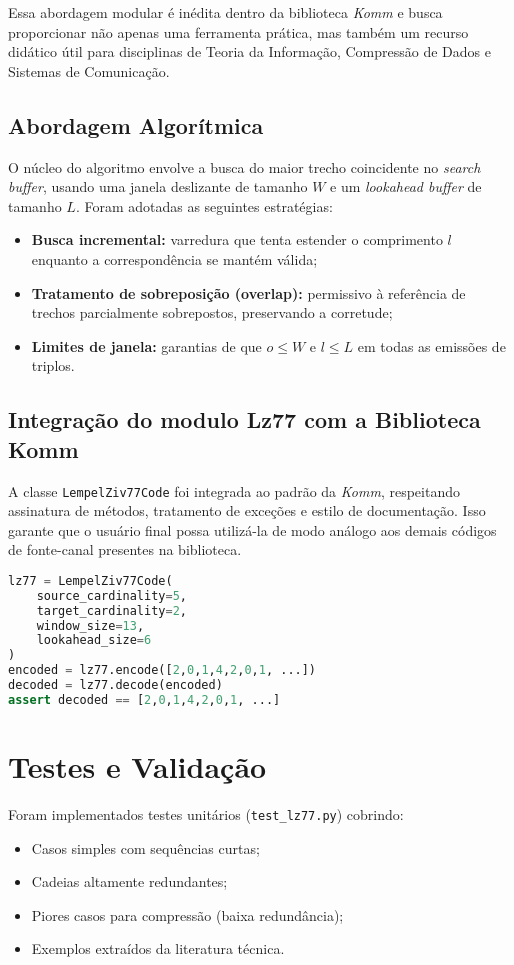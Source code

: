 Essa abordagem modular é inédita dentro da biblioteca \textit{Komm} e busca
proporcionar não apenas uma ferramenta prática, mas também um recurso didático
útil para disciplinas de Teoria da Informação, Compressão de Dados e Sistemas
de Comunicação.

\subsection{Abordagem Algorítmica}

O núcleo do algoritmo envolve a busca do maior trecho coincidente no
\textit{search buffer}, usando uma janela deslizante de tamanho $W$ e um
\textit{lookahead buffer} de tamanho $L$. Foram adotadas as seguintes
estratégias:
\begin{itemize}
    \item \textbf{Busca incremental:} varredura que tenta estender o comprimento $l$ enquanto a correspondência se mantém válida;
    \item \textbf{Tratamento de sobreposição (overlap):} permissivo à referência de trechos parcialmente sobrepostos, preservando a corretude;
    \item \textbf{Limites de janela:} garantias de que $o \leq W$ e $l \leq L$ em todas as emissões de triplos.
\end{itemize}


\subsection{Integração do modulo Lz77 com a Biblioteca Komm}
A classe \texttt{LempelZiv77Code} foi integrada ao padrão da \textit{Komm},
respeitando assinatura de métodos, tratamento de exceções e estilo de
documentação. Isso garante que o usuário final possa utilizá-la de modo análogo
aos demais códigos de fonte-canal presentes na biblioteca.
\begin{lstlisting}[language=Python, caption={Exemplo de uso do LZ77 integrado à Komm}]
lz77 = LempelZiv77Code(
    source_cardinality=5,
    target_cardinality=2,
    window_size=13,
    lookahead_size=6
)
encoded = lz77.encode([2,0,1,4,2,0,1, ...])
decoded = lz77.decode(encoded)
assert decoded == [2,0,1,4,2,0,1, ...]
\end{lstlisting}

\section{Testes e Validação}
Foram implementados testes unitários (\texttt{test\_lz77.py}) cobrindo:
\begin{itemize}
    \item Casos simples com sequências curtas;
    \item Cadeias altamente redundantes;
    \item Piores casos para compressão (baixa redundância);
    \item Exemplos extraídos da literatura técnica.
\end{itemize}

